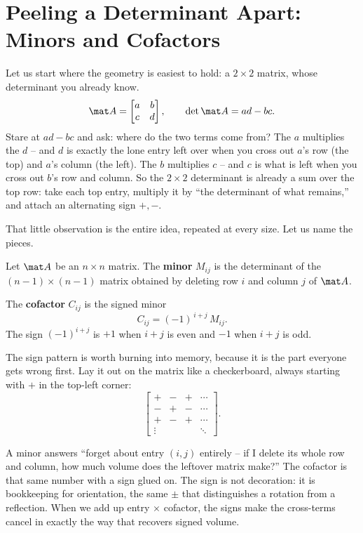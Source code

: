 \section{Peeling a Determinant Apart: Minors and Cofactors}

Let us start where the geometry is easiest to hold: a $2\times2$ matrix, whose determinant you
already know.
\[
\mat A=\begin{bmatrix} a & b \\ c & d \end{bmatrix},\qquad \det\mat A = ad-bc.
\]
Stare at $ad-bc$ and ask: where do the two terms come from? The $a$ multiplies the $d$ -- and $d$ is
exactly the lone entry left over when you cross out $a$'s row (the top) and $a$'s column (the left).
The $b$ multiplies $c$ -- and $c$ is what is left when you cross out $b$'s row and column. So the
$2\times2$ determinant is already a sum over the top row: take each top entry, multiply it by ``the
determinant of what remains,'' and attach an alternating sign $+,-$.

That little observation is the entire idea, repeated at every size. Let us name the pieces.

\begin{definition}[Minor]\label{ch22:def-minor}
Let $\mat A$ be an $n\times n$ matrix. The \textbf{minor} $M_{ij}$ is the determinant of the
$(n-1)\times(n-1)$ matrix obtained by deleting row $i$ and column $j$ of $\mat A$.
\end{definition}

\begin{definition}[Cofactor]\label{ch22:def-cofactor}
The \textbf{cofactor} $C_{ij}$ is the signed minor
\[
C_{ij} = (-1)^{\,i+j}\,M_{ij}.
\]
The sign $(-1)^{i+j}$ is $+1$ when $i+j$ is even and $-1$ when $i+j$ is odd.
\end{definition}

The sign pattern is worth burning into memory, because it is the part everyone gets wrong first. Lay
it out on the matrix like a checkerboard, always starting with $+$ in the top-left corner:
\[
\begin{bmatrix}
+ & - & + & \cdots \\
- & + & - & \cdots \\
+ & - & + & \cdots \\
\vdots & & & \ddots
\end{bmatrix}.
\]

\begin{intuitionbox}
A minor answers ``forget about entry $(i,j)$ entirely -- if I delete its whole row and column, how
much volume does the leftover matrix make?'' The cofactor is that same number with a sign glued on.
The sign is not decoration: it is bookkeeping for orientation, the same $\pm$ that distinguishes a
rotation from a reflection. When we add up entry $\times$ cofactor, the signs make the cross-terms
cancel in exactly the way that recovers signed volume.
\end{intuitionbox}

